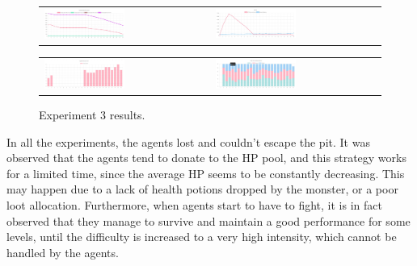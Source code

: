 \begin{figure}[htbp]
\begin{tabular}{ll}
    \centering
    \includegraphics[width=0.5\textwidth]{007_team_4_agent_design/figures/EX3_3.jpg}
    &
    \includegraphics[width=0.5\textwidth]{007_team_4_agent_design/figures/EX3_4.jpg}
\end{tabular}

\end{figure}


\begin{figure}[htbp]
\begin{tabular}{ll}
    \centering
    \includegraphics[width=0.5\textwidth]{007_team_4_agent_design/figures/EX3_6.jpg}
    &
    \includegraphics[width=0.5\textwidth]{007_team_4_agent_design/figures/EX3_5.jpg}
\end{tabular}
    \caption{Experiment 3 results.}
    \label{fig:exp3results}
\end{figure}


\par In all the experiments, the agents lost and couldn't escape the pit. It was observed that the agents tend to donate to the HP pool, and this strategy works for a limited time, since the average HP seems to be constantly decreasing. This may happen due to a lack of health potions dropped by the monster, or a poor loot allocation. Furthermore, when agents start to have to fight, it is in fact observed that they manage to survive and maintain a good performance for some levels, until the difficulty is increased to a very high intensity, which cannot be handled by the agents.


